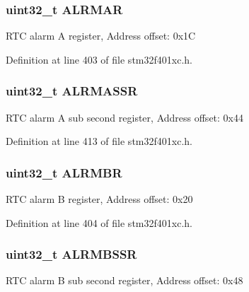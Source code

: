 \subsubsection[{\texorpdfstring{A\+L\+R\+M\+AR}{ALRMAR}}]{ uint32\+\_\+t A\+L\+R\+M\+AR}\hypertarget{struct_r_t_c___type_def_ac005b1a5bc52634d5a34578cc9d2c3f6}{}\label{struct_r_t_c___type_def_ac005b1a5bc52634d5a34578cc9d2c3f6}
R\+TC alarm A register, Address offset\+: 0x1C 

Definition at line 403 of file stm32f401xc.\+h.

\subsubsection[{\texorpdfstring{A\+L\+R\+M\+A\+S\+SR}{ALRMASSR}}]{ uint32\+\_\+t A\+L\+R\+M\+A\+S\+SR}\hypertarget{struct_r_t_c___type_def_a61282fa74cede526af85fd9d20513646}{}\label{struct_r_t_c___type_def_a61282fa74cede526af85fd9d20513646}
R\+TC alarm A sub second register, Address offset\+: 0x44 

Definition at line 413 of file stm32f401xc.\+h.

\subsubsection[{\texorpdfstring{A\+L\+R\+M\+BR}{ALRMBR}}]{ uint32\+\_\+t A\+L\+R\+M\+BR}\hypertarget{struct_r_t_c___type_def_a4e513deb9f58a138ad9f317cc5a3555d}{}\label{struct_r_t_c___type_def_a4e513deb9f58a138ad9f317cc5a3555d}
R\+TC alarm B register, Address offset\+: 0x20 

Definition at line 404 of file stm32f401xc.\+h.

\subsubsection[{\texorpdfstring{A\+L\+R\+M\+B\+S\+SR}{ALRMBSSR}}]{ uint32\+\_\+t A\+L\+R\+M\+B\+S\+SR}\hypertarget{struct_r_t_c___type_def_a4ef7499da5d5beb1cfc81f7be057a7b2}{}\label{struct_r_t_c___type_def_a4ef7499da5d5beb1cfc81f7be057a7b2}
R\+TC alarm B sub second register, Address offset\+: 0x48 

